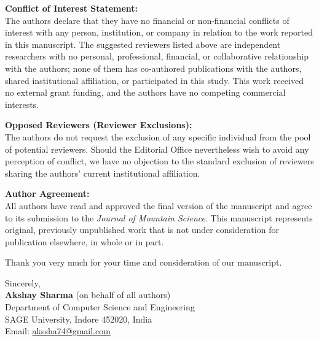 \documentclass[11pt,a4paper]{article}
\begin{document}
\medskip
\noindent
\textbf{Conflict of Interest Statement:} \\
The authors declare that they have no financial or non-financial conflicts of interest with any person, institution, or company in relation to the work reported in this manuscript. The suggested reviewers listed above are independent researchers with no personal, professional, financial, or collaborative relationship with the authors; none of them has co-authored publications with the authors, shared institutional affiliation, or participated in this study. This work received no external grant funding, and the authors have no competing commercial interests.

\medskip
\noindent
\textbf{Opposed Reviewers (Reviewer Exclusions):} \\
The authors do not request the exclusion of any specific individual from the pool of potential reviewers. Should the Editorial Office nevertheless wish to avoid any perception of conflict, we have no objection to the standard exclusion of reviewers sharing the authors' current institutional affiliation.

\medskip
\noindent
\textbf{Author Agreement:} \\
All authors have read and approved the final version of the manuscript and agree to its submission to the \textit{Journal of Mountain Science}. This manuscript represents original, previously unpublished work that is not under consideration for publication elsewhere, in whole or in part.

\medskip
\noindent
Thank you very much for your time and consideration of our manuscript.

\bigskip
\noindent
Sincerely, \\[0.5em]
\textbf{Akshay Sharma} (on behalf of all authors) \\
Department of Computer Science and Engineering \\
SAGE University, Indore 452020, India \\
Email: \href{mailto:akssha74@gmail.com}{akssha74@gmail.com}
\end{document}
